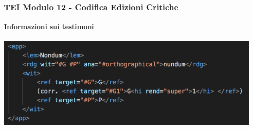 \begin{frame}
    \frametitle{TEI Modulo 12 - Codifica Edizioni Critiche}
    \framesubtitle{Informazioni sui testimoni}
    \addtocounter{nframe}{1}
    









    
    \begin{center}
        \includegraphics[width=.95\textwidth]{imgs/app-wit.png}
    \end{center}

\end{frame}



